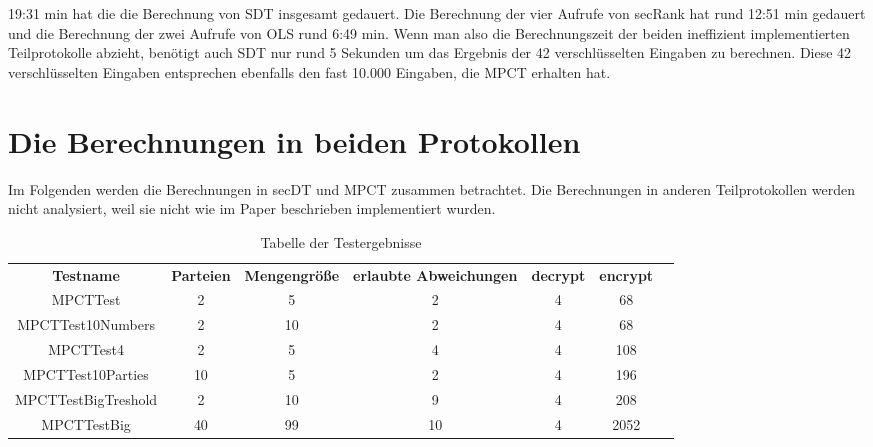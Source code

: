19:31 min hat die die Berechnung von SDT insgesamt gedauert. Die Berechnung der vier Aufrufe von secRank hat rund 12:51 min gedauert und die Berechnung der zwei Aufrufe von OLS rund 6:49 min. Wenn man also die Berechnungszeit der beiden ineffizient implementierten Teilprotokolle abzieht, benötigt auch SDT nur rund 5 Sekunden um das Ergebnis der 42 verschlüsselten Eingaben zu berechnen. Diese 42 verschlüsselten Eingaben entsprechen ebenfalls den fast 10.000 Eingaben, die MPCT erhalten hat.


\section{Die Berechnungen in beiden Protokollen}
Im Folgenden werden die Berechnungen in secDT und MPCT zusammen betrachtet.
Die Berechnungen in anderen Teilprotokollen werden nicht analysiert, weil sie nicht wie im Paper \cite{Doettling2021} beschrieben implementiert wurden.

   \begin{table}[!h]
     \centering
     \begin{tabular}{ccccccc}
       \textbf{Testname} & \textbf{Parteien} & \textbf{Mengengröße} & \textbf{erlaubte Abweichungen} & \textbf{decrypt} &\textbf{encrypt}\\
       MPCTTest & 2 & 5 & 2 & 4 & 68\\
       MPCTTest10Numbers & 2 & 10 & 2 & 4 & 68\\
       MPCTTest4 & 2 & 5 & 4 & 4 & 108\\
       MPCTTest10Parties & 10 & 5 & 2 & 4 & 196\\
       MPCTTestBigTreshold & 2 & 10 & 9 & 4 & 208\\
       MPCTTestBig &40 & 99 & 10 & 4 & 2052\\
     \end{tabular}

     \caption{Tabelle der Testergebnisse}
     \label{tbl:results}

   \end{table}
   
